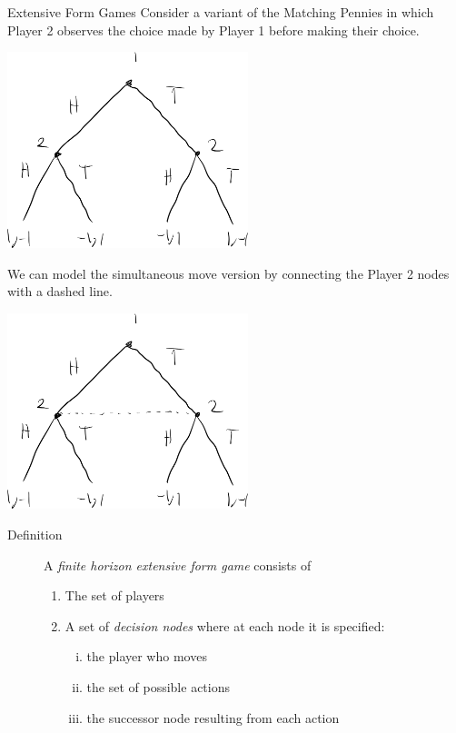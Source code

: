 \documentclass[8pt]{extarticle}
\begin{document}
  \begin{problem}{Extensive Form Games}
    Consider a variant of the Matching Pennies in which Player 2 observes the choice made by Player 1 before making their choice.
    \begin{center}
      \includegraphics[width=7cm]{images/matching_pennies_tree.png}
    \end{center}
    We can model the simultaneous move version by connecting the Player 2 nodes with a dashed line.
    \begin{center}
      \includegraphics[width=7cm]{images/matching_pennies_simultaneous.png}
    \end{center}
    \begin{description}
      \item[Definition] A \textit{finite horizon extensive form game} consists of
        \begin{enumerate}[(1)]
          \item The set of players
          \item A set of \textit{decision nodes} where at each node it is specified:
            \begin{enumerate}[(i)]
              \item the player who moves
              \item the set of possible actions
              \item the successor node resulting from each action

\end{enumerate}
\end{enumerate}
\end{description}
\end{problem}
\end{document}
